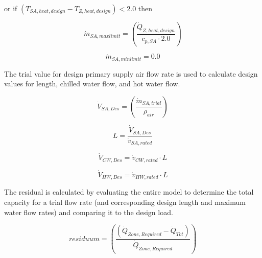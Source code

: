 or if \(( {T_{SA,heat,design } } - {T_{Z,heat,design } }) < 2.0\) then

\begin{equation}
  {\dot m_{SA,max limit}} = { \left(\frac{{\dot Q_{Z,heat,design } }}{{c_{p,SA}} \cdot 2.0 } \right) }
\end{equation}

\begin{equation}
  {\dot m_{SA,min limit}} = {0.0}
\end{equation}

The trial value for design primary supply air flow rate is used to calculate design values for length, chilled water flow, and hot water flow.

\begin{equation}
  {\dot V_{SA,Des}} = { \left(\frac{ {\dot m_{SA,trial}} }{{\rho_{air}} } \right) }
\end{equation}

\begin{equation}
  {L} = {\frac{{\dot V_{SA,Des}}}{{\dot v_{SA,rated}}}  }
\end{equation}

\begin{equation}
  {\dot V_{CW,Des}} = {{\dot v_{CW,rated}} \cdot {L} }
\end{equation}

\begin{equation}
  {\dot V_{HW,Des}} = {{\dot v_{HW,rated}} \cdot {L} }
\end{equation}

The residual is calculated by evaluating the entire model to determine the total capacity for a trial flow rate (and corresponding design length and maximum water flow rates) and comparing it to the design load.

\begin{equation}
  {residuum} = \left(\frac{ ({\dot Q_{Zone, Required}} - {\dot Q_{Tot}} )}{{\dot Q_{Zone, Required}}}\right)
\end{equation}

